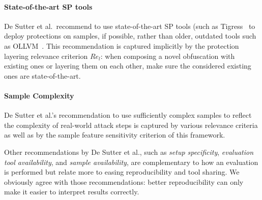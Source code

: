 \paragraph{State-of-the-art SP tools} De Sutter et al.\ recommend to use state-of-the-art SP tools (such as Tigress~\cite{tigress2023} to deploy protections on samples, if possible, rather than older, outdated tools such as OLLVM~\cite{ollvm}. This recommendation is captured implicitly by the protection layering relevance criterion $Re_l$: when composing a novel obfuscation with existing ones or layering them on each other, make sure the considered existing ones are state-of-the-art. 
\paragraph{Sample Complexity} De Sutter et al.'s recommendation to use sufficiently complex samples to reflect the complexity of real-world attack steps is captured by various relevance criteria as well as by the sample feature sensitivity criterion of this framework.   

\vspace{0.2cm}

Other recommendations by De Sutter et al., such as \emph{setup specificity}, \emph{evaluation tool availability}, and \emph{sample availability}, are complementary to how an evaluation is performed but relate more to easing reproducibility and tool sharing. We obviously agree with those recommendations: better reproducibility can only make it easier to interpret results correctly.